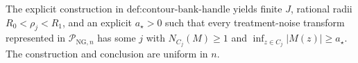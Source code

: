 The explicit construction in \(\text{def:contour-bank-handle}\) yields finite \(J\), rational radii \(R_0<\rho_j<R_1\), and an explicit \(a_{\star}>0\) such that every treatment-noise transform represented in \(\mathcal P_{\mathrm{NG},n}\) has some \(j\) with \(N_{C_j}(M)\ge1\) and \(\inf_{z\in C_j}|M(z)|\ge a_{\star}\).  The construction and conclusion are uniform in \(n\).